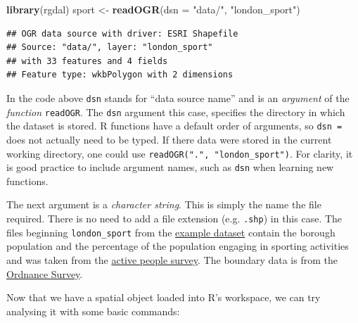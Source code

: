 \documentclass[]{article}
\newenvironment{Shaded}{}{}
\newcommand{\KeywordTok}[1]{\textcolor[rgb]{0.00,0.44,0.13}{\textbf{{#1}}}}
\newcommand{\DataTypeTok}[1]{\textcolor[rgb]{0.56,0.13,0.00}{{#1}}}
\newcommand{\StringTok}[1]{\textcolor[rgb]{0.25,0.44,0.63}{{#1}}}
\newcommand{\NormalTok}[1]{{#1}}
\begin{document}
\begin{Shaded}
\begin{Highlighting}[]
\KeywordTok{library}\NormalTok{(rgdal)}
\NormalTok{sport <- }\KeywordTok{readOGR}\NormalTok{(}\DataTypeTok{dsn =} \StringTok{"data/"}\NormalTok{, }\StringTok{"london_sport"}\NormalTok{)}
\end{Highlighting}
\end{Shaded}
\begin{verbatim}
## OGR data source with driver: ESRI Shapefile 
## Source: "data/", layer: "london_sport"
## with 33 features and 4 fields
## Feature type: wkbPolygon with 2 dimensions
\end{verbatim}
In the code above \texttt{dsn} stands for ``data source name'' and is an
\emph{argument} of the \emph{function} \texttt{readOGR}. The
\texttt{dsn} argument this case, specifies the directory in which the
dataset is stored. R functions have a default order of arguments, so
\texttt{dsn =} does not actually need to be typed. If there data were
stored in the current working directory, one could use
\texttt{readOGR(".", "london\_sport")}. For clarity, it is good practice
to include argument names, such as \texttt{dsn} when learning new
functions.

The next argument is a \emph{character string}. This is simply the name
the file required. There is no need to add a file extension (e.g.
\texttt{.shp}) in this case. The files beginning \texttt{london\_sport}
from the
\href{http://spatial.ly/wp-content/uploads/2013/12/spatialggplot.zip}{example
dataset} contain the borough population and the percentage of the
population engaging in sporting activities and was taken from the
\href{http://data.london.gov.uk/datastore/package/active-people-survey-kpi-data-borough}{active
people survey}. The boundary data is from the
\href{http://www.ordnancesurvey.co.uk/oswebsite/opendata/}{Ordnance
Survey}.

Now that we have a spatial object loaded into R's workspace, we can try
analysing it with some basic commands:
\end{document}
